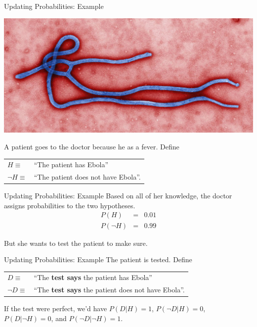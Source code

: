 \documentclass{beamer}
\begin{document}
\begin{frame}[t]{Updating Probabilities: Example}
\begin{center}
\includegraphics[scale=0.5]{figures/ebola.jpg}
\end{center}
A patient goes to the doctor because he as a fever. Define
\begin{center}
\begin{tabular}{ll}
$H \equiv $ & ``The patient has Ebola''\\
$\neg H \equiv $ & ``The patient does not have Ebola''.
\end{tabular}
\end{center}

\end{frame}

\begin{frame}[t]{Updating Probabilities: Example}
Based on all of her knowledge, the doctor assigns probabilities to the two
hypotheses.
\begin{eqnarray*}
P(H) &=& 0.01\\
P(\neg H) &=& 0.99
\end{eqnarray*}

But she wants to test the patient to make sure.
\end{frame}



\begin{frame}[t]{Updating Probabilities: Example}
The patient is tested. Define

\begin{center}
\begin{tabular}{ll}
$D \equiv $ & ``The {\bf test says} the patient has Ebola''\\
$\neg D \equiv $ & ``The {\bf test says} the patient does not have Ebola''.
\end{tabular}
\end{center}

If the test were perfect, we'd have $P(D | H) = 1$, $P(\neg D | H) = 0$,
$P(D | \neg H) = 0$, and $P(\neg D | \neg H) = 1$.
\end{frame}
\end{document}

